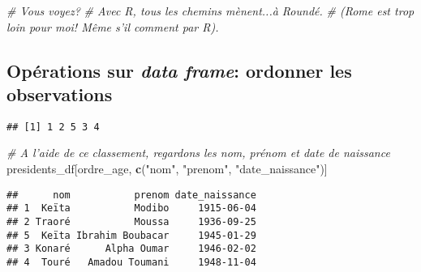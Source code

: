 \documentclass[]{book}
\newenvironment{Shaded}{\begin{snugshade}}{\end{snugshade}}
\newcommand{\KeywordTok}[1]{\textcolor[rgb]{0.13,0.29,0.53}{\textbf{#1}}}
\newcommand{\StringTok}[1]{\textcolor[rgb]{0.31,0.60,0.02}{#1}}
\newcommand{\CommentTok}[1]{\textcolor[rgb]{0.56,0.35,0.01}{\textit{#1}}}
\newcommand{\OperatorTok}[1]{\textcolor[rgb]{0.81,0.36,0.00}{\textbf{#1}}}
\newcommand{\NormalTok}[1]{#1}
\begin{document}
\begin{Shaded}
\begin{Highlighting}[]
\CommentTok{# Vous voyez? }
\CommentTok{# Avec R, tous les chemins mènent...à Roundé.}
\CommentTok{# (Rome est trop loin pour moi! Même s'il comment par R).}
\end{Highlighting}
\end{Shaded}

\normalsize

\subsection{\texorpdfstring{Opérations sur \emph{data frame}: ordonner
les
observations}{Opérations sur data frame: ordonner les observations}}\label{operations-sur-data-frame-ordonner-les-observations}

\tiny

\begin{Shaded}
\end{Shaded}

\begin{verbatim}
## [1] 1 2 5 3 4
\end{verbatim}

\begin{Shaded}
\begin{Highlighting}[]
\CommentTok{# A l'aide de ce classement, regardons les nom, prénom et date de naissance}
\NormalTok{presidents_df[ordre_age, }\KeywordTok{c}\NormalTok{(}\StringTok{"nom"}\NormalTok{, }\StringTok{"prenom"}\NormalTok{, }\StringTok{"date_naissance"}\NormalTok{)]}
\end{Highlighting}
\end{Shaded}

\begin{verbatim}
##      nom           prenom date_naissance
## 1  Keïta           Modibo     1915-06-04
## 2 Traoré           Moussa     1936-09-25
## 5  Keïta Ibrahim Boubacar     1945-01-29
## 3 Konaré      Alpha Oumar     1946-02-02
## 4  Touré   Amadou Toumani     1948-11-04
\end{verbatim}
\end{document}
